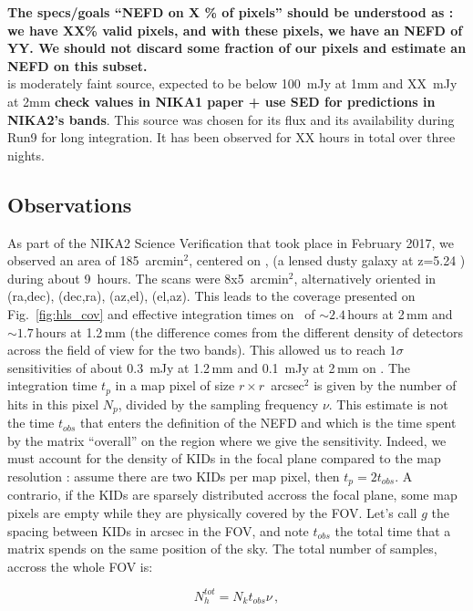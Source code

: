 {\bf The specs/goals ``NEFD on X \% of pixels'' should be understood as : we have
XX\% valid pixels, and with these pixels, we have an NEFD of YY. We should not
discard some fraction of our pixels and estimate an NEFD on this subset.}\\

\hls is moderately faint source, expected to be below 100~mJy at 1mm and
XX~mJy at 2mm {\bf check values in NIKA1 paper + use SED for predictions in
  NIKA2's bands}. This source was chosen for its flux and its availability during
Run9 for long integration. It has been observed for XX hours in total over three
nights.


\subsection{Observations}

As part of the NIKA2 Science Verification that took place in February 2017, we
observed an area of 185~arcmin$^2$, centered on \hls, (a lensed dusty galaxy at
z=5.24 \cite{combes2012}) during about 9~hours. The scans were 8x5~arcmin$^2$,
alternatively oriented in (ra,dec), (dec,ra), (az,el), (el,az). This leads to
the coverage presented on Fig.~\ref{fig:hls_cov} and effective integration times
on \hls\ of $\sim 2.4$\,hours at 2\,mm and $\sim 1.7$\,hours at 1.2\,mm (the
difference comes from the different density of detectors across the field of
view for the two bands). This allowed us to reach $1\sigma$ sensitivities of
about 0.3~mJy at 1.2\,mm and 0.1~mJy at 2\,mm on \hls. The integration time
$t_p$ in a map pixel of size $r\times r$~arcsec$^2$ is given by the number of hits in
this pixel $N_p$, divided by the sampling frequency $\nu$. This estimate is not
the time $t_{obs}$ that enters the definition of the NEFD and which is the time
spent by the matrix ``overall'' on the region where we give the
sensitivity. Indeed, we must account for the density of KIDs in the focal plane
compared to the map resolution : assume there are two KIDs per map pixel, then
$t_p = 2 t_{obs}$. A contrario, if the KIDs are sparsely distributed accross the
focal plane, some map pixels are empty while they are physically covered by the
FOV. Let's call $g$ the spacing between KIDs in arcsec in the FOV, and note
$t_{obs}$ the total time that a matrix spends on the same position of the
sky. The total number of samples, accross the whole FOV is:

\begin{equation}
N_h^{tot} = N_k t_{obs} \nu \,,
\end{equation}

